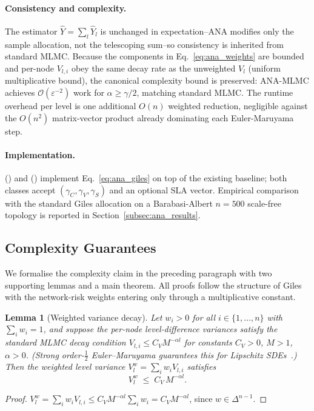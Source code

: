 \documentclass{ieeeaccess}
\newtheorem{lemma}{Lemma}
\begin{document}
\paragraph{Consistency and complexity.}
The estimator $\hat Y = \sum_l \hat Y_l$ is unchanged in expectation--ANA modifies only the
sample allocation, not the telescoping sum--so consistency is inherited from standard MLMC.
Because the components in Eq.~\eqref{eq:ana_weights} are bounded and per-node $V_{l,i}$ obey the
same decay rate as the unweighted $V_l$ (uniform multiplicative bound), the canonical complexity
bound is preserved: ANA-MLMC achieves $\mathcal{O}(\varepsilon^{-2})$ work for
$\alpha \ge \gamma/2$, matching standard MLMC. The runtime overhead per level is one additional
$O(n)$ weighted reduction, negligible against the $O(n^2)$ matrix-vector product already
dominating each Euler-Maruyama step.

\paragraph{Implementation.}
 () and
 () implement
Eq.~\eqref{eq:ana_giles} on top of the existing baseline; both classes accept
$(\gamma_C,\gamma_V,\gamma_S)$ and an optional SLA vector. Empirical comparison with the
standard Giles allocation on a Barabasi-Albert $n=500$ scale-free topology is reported in
Section~\ref{subsec:ana_results}.

\subsection{Complexity Guarantees}
\label{subsec:complexity}

We formalise the complexity claim in the preceding paragraph with two supporting lemmas and a
main theorem.  All proofs follow the structure of Giles~\cite{giles2015multilevel} with the
network-risk weights entering only through a multiplicative constant.

\begin{lemma}[Weighted variance decay]
\label{lem:var_decay}
Let $w_i > 0$ for all $i \in \{1,\ldots,n\}$ with $\sum_i w_i = 1$, and suppose the
per-node level-difference variances satisfy the standard MLMC decay condition
$V_{l,i} \le C_V M^{-\alpha l}$ for constants $C_V > 0$, $M > 1$, $\alpha > 0$.
(Strong order-$\tfrac{1}{2}$ Euler--Maruyama guarantees this for Lipschitz
SDEs~\cite{kloeden1992}.)
Then the weighted level variance $V_l^w = \sum_i w_i V_{l,i}$ satisfies
\begin{equation}
    V_l^w \;\le\; C_V\, M^{-\alpha l} .
\end{equation}
\end{lemma}
\begin{proof}
$V_l^w = \sum_i w_i V_{l,i} \le C_V M^{-\alpha l} \sum_i w_i = C_V M^{-\alpha l}$,
since $w \in \Delta^{n-1}$.
\end{proof}
\end{document}
